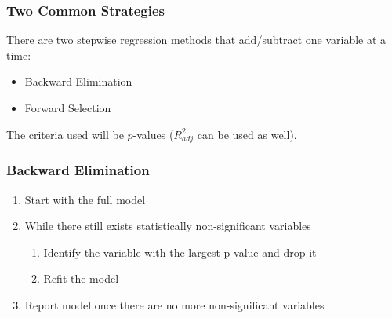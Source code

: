 \documentclass[handout]{beamer}
\newcommand{\blue}[1]{\textcolor{blue2}{#1}}
\begin{document}
\begin{frame}[fragile]
\frametitle{Two Common Strategies}

There are two \blue{stepwise regression} methods that add/subtract one variable at a time:
\begin{itemize}
\item Backward Elimination
\item Forward Selection
\end{itemize}

\pause
\vspace{0.5cm}

The criteria used will be $p$-values ($R^2_{adj}$ can be used as well).  

\end{frame}


\begin{frame}[fragile]
\frametitle{Backward Elimination}

\begin{enumerate}
\item Start with the \blue{full model}
\pause\item While there still exists statistically non-significant variables
\begin{enumerate}
\item Identify the variable with the largest p-value and drop it
\item Refit the model
\end{enumerate}
\pause\item Report model once there are no more non-significant variables
\end{enumerate}

\end{frame}
\end{document}
